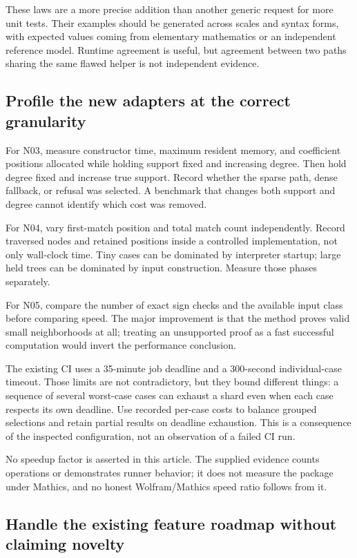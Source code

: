 \documentclass[11pt,a4paper]{article}
\begin{document}
These laws are a more precise addition than another generic request for more
unit tests. Their examples should be generated across scales and syntax forms,
with expected values coming from elementary mathematics or an independent
reference model. Runtime agreement is useful, but agreement between two paths
sharing the same flawed helper is not independent evidence.

\subsection{Profile the new adapters at the correct granularity}

For N03, measure constructor time, maximum resident memory, and coefficient
positions allocated while holding support fixed and increasing degree. Then
hold degree fixed and increase true support. Record whether the sparse path,
dense fallback, or refusal was selected. A benchmark that changes both support
and degree cannot identify which cost was removed.

For N04, vary first-match position and total match count independently. Record
traversed nodes and retained positions inside a controlled implementation, not
only wall-clock time. Tiny cases can be dominated by interpreter startup;
large held trees can be dominated by input construction. Measure those phases
separately.

For N05, compare the number of exact sign checks and the available input class
before comparing speed. The major improvement is that the method proves
valid small neighborhoods at all; treating an unsupported proof as a fast
successful computation would invert the performance conclusion.

The existing CI uses a 35-minute job deadline and a 300-second individual-case
timeout. Those limits are not contradictory, but they bound different things:
a sequence of several worst-case cases can exhaust a shard even when each case
respects its own deadline. Use recorded per-case costs to balance grouped
selections and retain partial results on deadline exhaustion. This is a
consequence of the inspected configuration, not an observation of a failed CI
run. \cite{workflow}

No speedup factor is asserted in this article. The supplied evidence counts
operations or demonstrates runner behavior; it does not measure the package
under Mathics, and no honest Wolfram/Mathics speed ratio follows from it.

\subsection{Handle the existing feature roadmap without claiming novelty}
\end{document}
